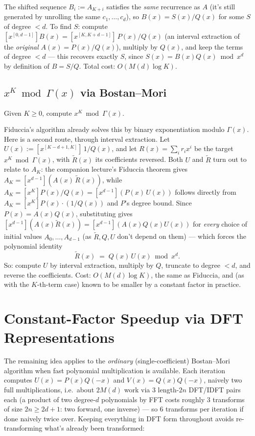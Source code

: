 \documentclass[11pt]{article}
\begin{document}
The shifted sequence $B_i := A_{K+i}$ satisfies the \emph{same}
recurrence as $A$ (it's still generated by unrolling the same $c_1,
\ldots, c_d$), so $B(x) = S(x)/Q(x)$ for some $S$ of degree $<d$. To find
$S$: compute $[x^{[0,d-1]}]B(x) = [x^{[K,K+d-1]}]\,P(x)/Q(x)$ (an
interval extraction of the \emph{original} $A(x)=P(x)/Q(x)$), multiply by
$Q(x)$, and keep the terms of degree $<d$ --- this recovers exactly $S$,
since $S(x) = B(x)Q(x) \bmod x^d$ by definition of $B=S/Q$. Total cost:
$O(M(d)\log K)$.

\subsection{\texorpdfstring{$x^K \bmod \Gamma(x)$}{x\^{}K mod Gamma(x)} via Bostan--Mori}
\begin{definitionbox}
Given $K \ge 0$, compute $x^K \bmod \Gamma(x)$.
\end{definitionbox}

Fiduccia's algorithm already solves this by binary exponentiation modulo
$\Gamma(x)$. Here is a second route, through interval extraction. Let
$U(x) := [x^{[K-d+1,K]}]\,1/Q(x)$, and let $R(x) = \sum_i r_i x^i$ be the
target $x^K \bmod \Gamma(x)$, with $\widetilde{R}(x)$ its coefficients
reversed. Both $U$ and $\widetilde R$ turn out to relate to $A_K$: the
companion lecture's Fiduccia theorem gives $A_K = [x^{d-1}](A(x)\,
\widetilde R(x))$, while $A_K = [x^K]P(x)/Q(x) = [x^{d-1}](P(x)\,U(x))$
follows directly from $A_K=[x^K]P(x)\cdot(1/Q(x))$ and $P$'s degree bound.
Since $P(x)=A(x)Q(x)$, substituting gives
$[x^{d-1}](A(x)\widetilde R(x)) = [x^{d-1}](A(x)Q(x)U(x))$ for
\emph{every} choice of initial values $A_0,\ldots,A_{d-1}$ (as $\widetilde
R, Q, U$ don't depend on them) --- which forces the polynomial identity
\[
  \widetilde R(x) \;=\; Q(x)\,U(x) \bmod x^d .
\]
So: compute $U$ by interval extraction, multiply by $Q$, truncate to
degree $<d$, and reverse the coefficients. Cost: $O(M(d)\log K)$, the
same as Fiduccia, and (as with the $K$-th-term case) known to be smaller
by a constant factor in practice.

\section{Constant-Factor Speedup via DFT Representations}
The remaining idea applies to the \emph{ordinary} (single-coefficient)
Bostan--Mori algorithm when fast polynomial multiplication is available.
Each iteration computes $U(x)=P(x)Q(-x)$ and $V(x)=Q(x)Q(-x)$, naively
two full multiplications, i.e.\ about $2M(d)$ work via $3$ length-$2n$
DFT/IDFT pairs each (a product of two degree-$d$ polynomials by FFT costs
roughly $3$ transforms of size $2n\ge 2d{+}1$: two forward, one
inverse) --- so $6$ transforms per iteration if done naively twice over.
Keeping everything in DFT form throughout avoids re-transforming what's
already been transformed:
\end{document}
